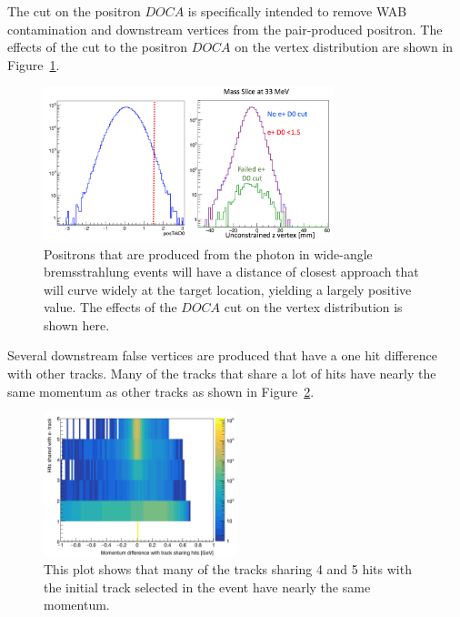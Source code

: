 The cut on the positron $DOCA$ is specifically intended to remove WAB contamination and downstream vertices from the pair-produced positron. The effects of the cut to the positron $DOCA$ on the vertex distribution are shown in Figure~\ref{fig:docacuteffect}. 

\begin{figure}[H]
  \centering
      \includegraphics[width=0.75\textwidth]{pics/searching/docacut.png}
  \caption[Cut effect on the postiron $DOCA$]{Positrons that are produced from the photon in wide-angle bremsstrahlung events will have a distance of closest approach that will curve widely at the target location, yielding a largely positive value. The effects of the $DOCA$ cut on the vertex distribution is shown here.}
  \label{fig:docacuteffect}
\end{figure} 

Several downstream false vertices are produced that have a one hit difference with other tracks. Many of the tracks that share a lot of hits have nearly the same momentum as other tracks as shown in Figure~\ref{fig:trkshare}.

\begin{figure}[H]
  \centering
      \includegraphics[width=0.5\textwidth]{pics/searching/TrkShareHits.png}
  \caption[Cut on shared hits between tracks]{This plot shows that many of the tracks sharing 4 and 5 hits with the initial track selected in the event have nearly the same momentum.}
  \label{fig:trkshare}
\end{figure} 

